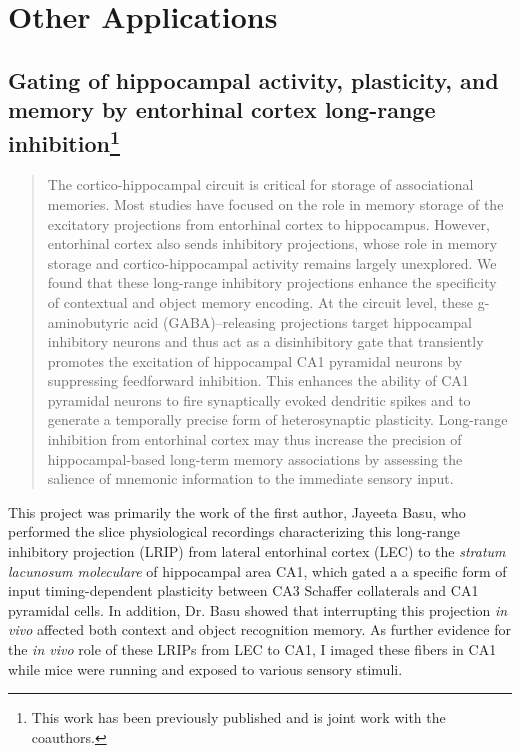 \acresetall
\chapter{Other Applications}
\label{ch:other}


\section[Gating of hippocampal activity, plasticity, and memory by entorhinal cortex long-range inhibition]{Gating of hippocampal activity, plasticity, and memory by entorhinal cortex long-range inhibition\footnote{This work has been previously published \citep{Basu2016} and is joint work with the coauthors.}}
\label{sec:other:LRIP}

\begin{quote}
The cortico-hippocampal circuit is critical for storage of associational memories. Most studies have focused on the role in memory storage of the excitatory projections from entorhinal cortex to hippocampus. However, entorhinal cortex also sends inhibitory projections, whose role in memory storage and cortico-hippocampal activity remains largely unexplored. We found that these long-range inhibitory projections enhance the specificity of contextual and object memory encoding. At the circuit level, these g-aminobutyric acid (GABA)–releasing projections target hippocampal inhibitory neurons and thus act as a disinhibitory gate that transiently promotes the excitation of hippocampal CA1 pyramidal neurons by suppressing feedforward inhibition. This enhances the ability of CA1 pyramidal neurons to fire synaptically evoked dendritic spikes and to generate a temporally precise form of heterosynaptic plasticity. Long-range inhibition from entorhinal cortex may thus increase the precision of hippocampal-based long-term memory associations by assessing the salience of mnemonic information to the immediate sensory input.
\end{quote}

This project was primarily the work of the first author, Jayeeta Basu, who performed the slice physiological recordings characterizing this long-range inhibitory projection (LRIP) from lateral entorhinal cortex (LEC) to the \emph{stratum lacunosum moleculare} of hippocampal area CA1, which gated a a specific form of input timing-dependent plasticity between CA3 Schaffer collaterals and CA1 pyramidal cells. In addition, Dr. Basu showed that interrupting this projection \emph{in vivo} affected both context and object recognition memory. As further evidence for the \emph{in vivo} role of these LRIPs from LEC to CA1, I imaged these fibers in CA1 while mice were running and exposed to various sensory stimuli.

